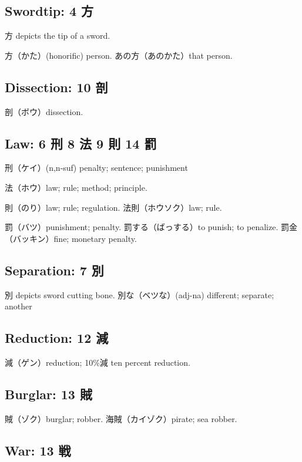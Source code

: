 \subsection{Swordtip: 4 方}

方 depicts the tip of a sword.

方（かた）(honorific) person.
あの方（あのかた）that person.

\subsection{Dissection: 10 剖}

剖（ボウ）dissection.

\subsection{Law: 6 刑 8 法 9 則 14 罰}

刑（ケイ）(n,n-suf) penalty; sentence; punishment

法（ホウ）law; rule; method; principle.

則（のり）law; rule; regulation.
法則（ホウソク）law; rule.

罰（バツ）punishment; penalty.
罰する（ばっする）to punish; to penalize.
罰金（バッキン）fine; monetary penalty.

\subsection{Separation: 7 別}

別 depicts sword cutting bone.
別な（ベツな）(adj-na) different; separate; another

\subsection{Reduction: 12 減}

減（ゲン）reduction; 10\%減 ten percent reduction.

\subsection{Burglar: 13 賊}

賊（ゾク）burglar; robber.
海賊（カイゾク）pirate; sea robber.

\subsection{War: 13 戦}

